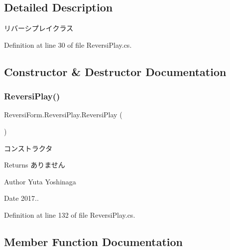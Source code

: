 \subsection{Detailed Description}
リバーシプレイクラス 

Definition at line 30 of file Reversi\+Play.\+cs.



\subsection{Constructor \& Destructor Documentation}
\mbox{\label{class_reversi_form_1_1_reversi_play_aeb78112f8fb7fd2c75b8e0f088939867}} 
\subsubsection{\texorpdfstring{Reversi\+Play()}{ReversiPlay()}}
{\footnotesize\ttfamily Reversi\+Form.\+Reversi\+Play.\+Reversi\+Play (\begin{DoxyParamCaption}{ }\end{DoxyParamCaption})}



コンストラクタ 

\begin{DoxyReturn}{Returns}
ありません 
\end{DoxyReturn}
\begin{DoxyAuthor}{Author}
Yuta Yoshinaga 
\end{DoxyAuthor}
\begin{DoxyDate}{Date}
2017.. 
\end{DoxyDate}


Definition at line 132 of file Reversi\+Play.\+cs.



\subsection{Member Function Documentation}
\mbox{\label{class_reversi_form_1_1_reversi_play_aae235e59005e054773bcf1bc0177d34a}} 

